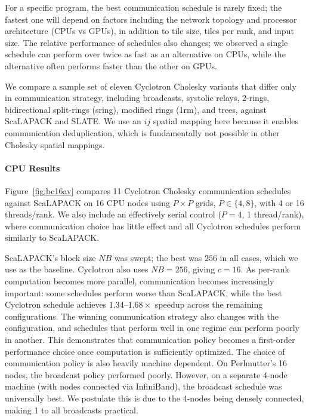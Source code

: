 \documentclass[sigplan, nonacm]{acmart}
\begin{document}
For a specific program, the best communication schedule is rarely fixed; the fastest one will depend on factors including the network topology and processor architecture (CPUs vs GPUs), in addition to tile size, tiles per rank, and input size. The relative performance of schedules also changes; we observed a single schedule can perform over twice as fast as an alternative on CPUs, while the alternative often performs faster than the other on GPUs.

We compare a sample set of eleven Cyclotron Cholesky variants that differ only in communication strategy, including broadcasts, systolic relays, 2-rings, bidirectional split-rings (sring), modified rings (1rm), and trees, against ScaLAPACK and SLATE. We use an $ij$ spatial mapping here because it enables communication deduplication, which is fundamentally not possible in other Cholesky spatial mappings.


\paragraph{CPU Results} Figure~\ref{fig:bc16av} compares 11 Cyclotron Cholesky communication schedules against ScaLAPACK on 16 CPU nodes using \(P\times P\) grids, \(P\in\{4,8\}\), with 4 or 16 threads/rank. We also include an effectively serial control (\(P=4\), 1 thread/rank), where communication choice has little effect and all Cyclotron schedules perform similarly to ScaLAPACK.

ScaLAPACK's block size \(NB\) was swept; the best was \(256\) in all cases, which we use as the baseline. Cyclotron also uses \(NB=256\), giving \(c=16\). As per-rank computation becomes more parallel, communication becomes increasingly important: some schedules perform worse than ScaLAPACK, while the best Cyclotron schedule achieves \(1.34\)--\(1.68\times\) speedup across the remaining configurations. The winning communication strategy also changes with the configuration, and schedules that perform well in one regime can perform poorly in another. This demonstrates that communication policy becomes a first-order performance choice once computation is sufficiently optimized.
The choice of communication policy is also heavily machine dependent. On Perlmutter's 16 nodes, the broadcast policy performed poorly. However, on a separate 4-node  machine (with nodes connected via InfiniBand), the broadcast schedule was universally best. We postulate this is due to the 4-nodes being densely connected, making 1 to all broadcasts practical. 
\end{document}

